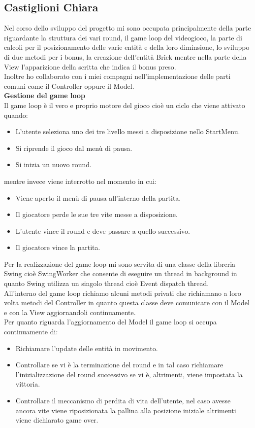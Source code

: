 \documentclass[a4paper,12pt]{report}
\begin{document}
\subsection{Castiglioni Chiara}
Nel corso dello sviluppo del progetto mi sono occupata principalmente della parte riguardante la struttura dei vari round, il game loop del videogioco,
la parte di calcoli per il posizionamento delle varie entità e della loro diminsione, lo sviluppo di due metodi per i bonus, la creazione dell'entità Brick
mentre nella parte della View l'apparizione della scritta che indica il bonus preso.\\Inoltre ho collaborato con i miei compagni nell'implementazione delle parti comuni come
il Controller oppure il Model.\\
\textbf{Gestione del game loop}
\\Il game loop è il vero e proprio motore del gioco cioè un ciclo che viene attivato quando:
\begin{itemize}
    \item L'utente seleziona uno dei tre livello messi a disposizione nello StartMenu.
    \item Si riprende il gioco dal menù di pausa.
    \item Si inizia un nuovo round.
\end{itemize}
mentre invece viene interrotto nel momento in cui:
\begin{itemize}
    \item Viene aperto il menù di pausa all'interno della partita.
    \item Il giocatore perde le sue tre vite messe a disposizione.
    \item L'utente vince il round e deve passare a quello successivo.
    \item Il giocatore vince la partita.
\end{itemize}
Per la realizzazione del game loop mi sono servita di una classe della libreria Swing cioè SwingWorker che consente di eseguire un thread in background
in quanto Swing utilizza un singolo thread cioè Event dispatch thread.
\\All'interno del game loop richiamo alcuni metodi privati che richiamano a loro volta metodi del Controller in quanto questa classe deve comunicare con il Model
e con la View aggiornandoli continuamente.
\\Per quanto riguarda l'aggiornamento del Model il game loop si occupa continuamente di:
\begin{itemize}
    \item Richiamare l'update delle entità in movimento.
    \item Controllare se vi è la terminazione del round e in tal caso richiamare l'inizializzazione del round successivo se vi è, altrimenti, viene impostata la vittoria.
    \item Controllare il meccanismo di perdita di vita dell'utente, nel caso avesse ancora vite viene riposizionata la pallina alla posizione iniziale altrimenti viene dichiarato game over.
\end{itemize}
\end{document}
